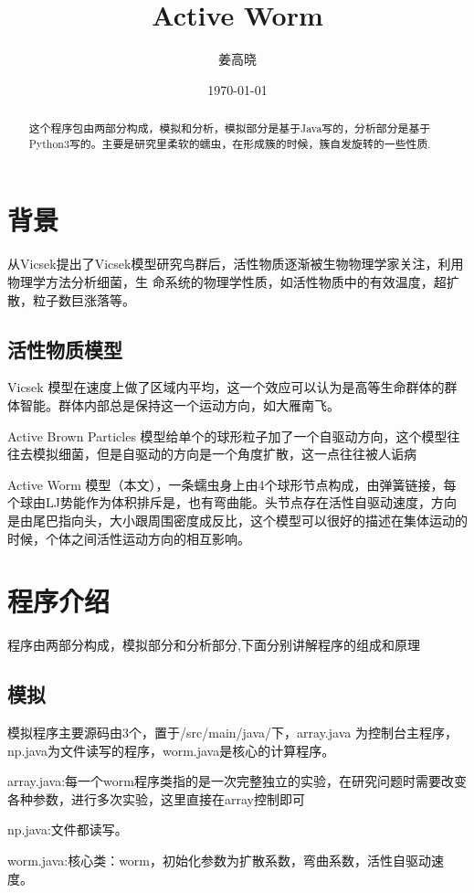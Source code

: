 \documentclass{article}
\begin{document}
\begin{CJK}
\title{Active Worm}
\author{姜高晓}
\date{\today}
\maketitle
\begin{abstract}
这个程序包由两部分构成，模拟和分析，模拟部分是基于Java写的，分析部分是基于Python3写的。主要是研究里柔软的蠕虫，在形成簇的时候，簇自发旋转的一些性质.
\end{abstract}

\section{背景}
	从Vicsek提出了Vicsek模型研究鸟群后，活性物质逐渐被生物物理学家关注，利用物理学方法分析细菌，生
命系统的物理学性质，如活性物质中的有效温度，超扩散，粒子数巨涨落等。
\subsection{活性物质模型}
	Vicsek 模型在速度上做了区域内平均，这一个效应可以认为是高等生命群体的群体智能。群体内部总是保持这一个运动方向，如大雁南飞。

	Active Brown Particles 模型给单个的球形粒子加了一个自驱动方向，这个模型往往去模拟细菌，但是自驱动的方向是一个角度扩散，这一点往往被人诟病

	Active Worm 模型（本文），一条蠕虫身上由4个球形节点构成，由弹簧链接，每个球由LJ势能作为体积排斥是，也有弯曲能。头节点存在活性自驱动速度，方向是由尾巴指向头，大小跟周围密度成反比，这个模型可以很好的描述在集体运动的时候，个体之间活性运动方向的相互影响。
\section{程序介绍}
	程序由两部分构成，模拟部分和分析部分,下面分别讲解程序的组成和原理
\subsection{模拟}
        模拟程序主要源码由3个，置于/src/main/java/下，array.java 为控制台主程序，np.java为文件读写的程序，worm.java是核心的计算程序。
	
	array.java:每一个worm程序类指的是一次完整独立的实验，在研究问题时需要改变各种参数，进行多次实验，这里直接在array控制即可

	np.java:文件都读写。

	worm.java:核心类：worm，初始化参数为扩散系数，弯曲系数，活性自驱动速度。


\end{CJK}
\end{document}
